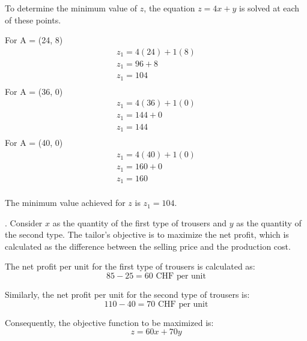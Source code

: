 \documentclass[unicode,11pt,a4paper,oneside,numbers=endperiod,openany]{scrartcl}
\begin{document}
To determine the minimum value of $z$, the equation $z = 4x + y$ is solved at each of these points.


For A = (24, 8) \newline
\begin{equation*}
		\begin{aligned}
 z_1 = 4 (24) + 1 (8) \\
 z_1 = 96 + 8 \\
 z_1 = 104 \\
 		\end{aligned}
\end{equation*}
\newline
For A = (36, 0)
\newline
\begin{equation*}
		\begin{aligned}
 z_1 = 4 (36) + 1 (0) \\
 z_1 =  144 + 0 \\
 z_1 = 144\\
 		\end{aligned}
\end{equation*}
\newline
For A = (40, 0)
\newline
\begin{equation*}
		\begin{aligned}
 z_1 = 4 (40) + 1 (0) \\
 z_1 =  160 + 0 \\
 z_1 = 160	\\
 		\end{aligned}
\end{equation*}
\newline

The minimum value achieved for $z$ is \textbf{$z_1 = 104$}.

\bigskip
{}. \newline
Consider $x$ as the quantity of the first type of trousers and $y$ as the quantity of the second type. The tailor's objective is to maximize the net profit, which is calculated as the difference between the selling price and the production cost.

\medskip
\noindent The net profit per unit for the first type of trousers is calculated as:
\[ 85 - 25 = 60 \text{ CHF per unit} \]

\noindent Similarly, the net profit per unit for the second type of trousers is:
\[ 110 - 40 = 70 \text{ CHF per unit} \]

\noindent Consequently, the objective function to be maximized is:
\[ z = 60x + 70y \]
\end{document}
